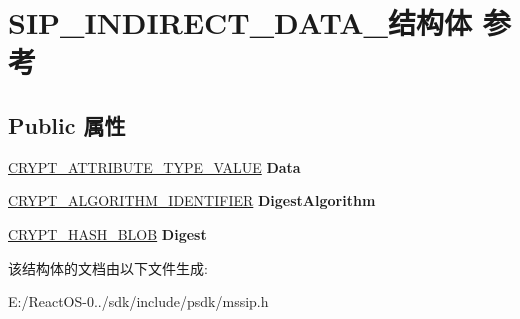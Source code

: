 \hypertarget{struct_s_i_p___i_n_d_i_r_e_c_t___d_a_t_a__}{}\section{S\+I\+P\+\_\+\+I\+N\+D\+I\+R\+E\+C\+T\+\_\+\+D\+A\+T\+A\+\_\+结构体 参考}
\label{struct_s_i_p___i_n_d_i_r_e_c_t___d_a_t_a__}
\subsection*{Public 属性}
\begin{DoxyCompactItemize}
\item 
\mbox{\label{struct_s_i_p___i_n_d_i_r_e_c_t___d_a_t_a___a761464e4f39c434ae7e52f3fe2303aac}} 
\hyperlink{struct___c_r_y_p_t___a_t_t_r_i_b_u_t_e___t_y_p_e___v_a_l_u_e}{C\+R\+Y\+P\+T\+\_\+\+A\+T\+T\+R\+I\+B\+U\+T\+E\+\_\+\+T\+Y\+P\+E\+\_\+\+V\+A\+L\+UE} {\bfseries Data}
\item 
\mbox{\label{struct_s_i_p___i_n_d_i_r_e_c_t___d_a_t_a___adf51b54b1135c89a82484e61b7d26cb8}} 
\hyperlink{struct___c_r_y_p_t___a_l_g_o_r_i_t_h_m___i_d_e_n_t_i_f_i_e_r}{C\+R\+Y\+P\+T\+\_\+\+A\+L\+G\+O\+R\+I\+T\+H\+M\+\_\+\+I\+D\+E\+N\+T\+I\+F\+I\+ER} {\bfseries Digest\+Algorithm}
\item 
\mbox{\label{struct_s_i_p___i_n_d_i_r_e_c_t___d_a_t_a___aa29c707fcba256e27cbd6b53d0c7d35c}} 
\hyperlink{struct___c_r_y_p_t_o_a_p_i___b_l_o_b}{C\+R\+Y\+P\+T\+\_\+\+H\+A\+S\+H\+\_\+\+B\+L\+OB} {\bfseries Digest}
\end{DoxyCompactItemize}


该结构体的文档由以下文件生成\+:\begin{DoxyCompactItemize}
\item 
E\+:/\+React\+O\+S-\/0../sdk/include/psdk/mssip.\+h\end{DoxyCompactItemize}
